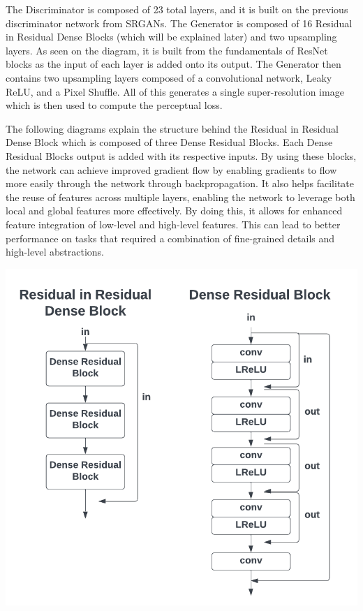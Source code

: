 \documentclass{article}
\begin{document}
The Discriminator is composed of 23 total layers, and it is built on the previous discriminator network from SRGANs. The Generator is composed of 16 Residual in Residual Dense Blocks (which will be explained later) and two upsampling layers. As seen on the diagram, it is built from the fundamentals of ResNet blocks as the input of each layer is added onto its output. The Generator then contains two upsampling layers composed of a convolutional network, Leaky ReLU, and a Pixel Shuffle. All of this generates a single super-resolution image which is then used to compute the perceptual loss.

The following diagrams explain the structure behind the Residual in Residual Dense Block which is composed of three Dense Residual Blocks. Each Dense Residual Blocks output is added with its respective inputs. By using these blocks, the network can achieve improved gradient flow by enabling gradients to flow more easily through the network through backpropagation. It also helps facilitate the reuse of features across multiple layers, enabling the network to leverage both local and global features more effectively. By doing this, it allows for enhanced feature integration of low-level and high-level features. This can lead to better performance on tasks that required a combination of fine-grained details and high-level abstractions.

\begin{center}
\includegraphics[scale=0.25]{images/rrdb.png}
\end{center}
\end{document}
